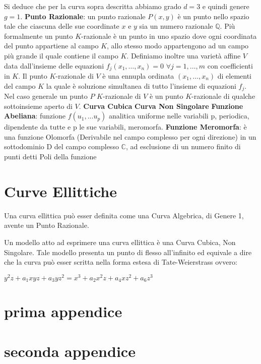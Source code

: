 \documentclass[a4paper,12pt]{tesiinfo}
\begin{document}
\newline
Si deduce che per la curva sopra descritta abbiamo grado $d = 3$ e quindi genere $g = 1$.
\newline\newline
%
%
%
\textbf{Punto Razionale}: un punto razionale $P(x, y)$ \`e un punto nello spazio tale che ciascuna delle sue coordinate $x$ e $y$ sia un numero razionale $\mathbb{Q}$. Pi\`u formalmente un punto $K$-razionale \`e un punto in uno spazio dove ogni coordinata del punto appartiene al campo $K$, allo stesso modo appartengono ad un campo pi\`u grande il quale contiene il campo $K$. 
\newline
Definiamo inoltre una variet\`a affine $V$ data dall'insieme delle equazioni $f_j(x_1, \ldots , x_n) = 0$ $\forall j = 1, \ldots, m$ con coefficienti in $K$. Il punto $K$-razionale di $V$ \`e una ennupla ordinata $(x_1, \ldots , x_n)$ di elementi del campo $K$ la quale \`e soluzione simultanea di tutto l'insieme di equazioni $f_j$. Nel caso generale un punto $P$ $K$-razionale di $V$ \`e un punto $K$-razionale di qualche sottoinsieme aperto di $V$.
\newline\newline
%
%
%
\textbf{Curva Cubica}
\newline\newline
%
%
%
\textbf{Curva Non Singolare}
\newline\newline
%
%
%
\textbf{Funzione Abeliana}: funzione $f(u_1, ... u_p)$ analitica uniforme nelle variabili p, periodica, dipendente da tutte e p le sue variabili, meromorfa.
\newline\newline
%
%
%
\textbf{Funzione Meromorfa}: \`e una funzione Olomorfa (Derivabile nel campo complesso per ogni direzione) in un sottodominio D del campo complesso $\mathbb{C}$, ad esclusione di un numero finito di punti detti Poli della funzione\newline\newline
%
%
%
%
%
%
%
%
%
%
\chapter{Curve Ellittiche}

Una curva ellittica pu\`o esser definita come una Curva Algebrica, di Genere 1, avente un Punto Razionale.

Un modello atto ad esprimere una curva ellittica \`e una Curva Cubica, Non Singolare. Tale modello presenta un punto di flesso all'infinito ed equivale a dire che la curva pu\`o esser scritta nella forma estesa di Tate-Weierstrass ovvero:

$y^{2}z + a_1xyz + a_3yz^2 =x^3 + a_2x^2z + a_4xz^2 + a_6z^3$
%
%
%
%
%
%
%
%
%
%
%
%
%
%
%
%
%
%
%
%
\appendice
\chapter{prima appendice}
%
%
%
%
%
%
%
%
%
%
\chapter{seconda appendice}
%
%
%
%
%
%
%
%
%
%
\end{document}
